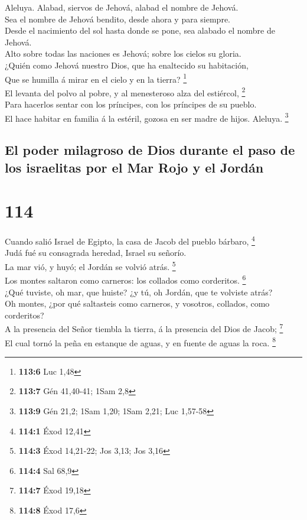  Aleluya. Alabad, siervos de Jehová, alabad el nombre de
Jehová.\\
 Sea el nombre de Jehová bendito, desde ahora y para
siempre.\\
 Desde el nacimiento del sol hasta donde se pone, sea
alabado el nombre de Jehová.\\
 Alto sobre todas las naciones es Jehová; sobre los cielos
su gloria.\\
 ¿Quién como Jehová nuestro Dios, que ha enaltecido su
habitación,\\
 Que se humilla á mirar en el cielo y en la tierra?
\footnote{\textbf{113:6} Luc 1,48}\\
 El levanta del polvo al pobre, y al menesteroso alza del
estiércol, \footnote{\textbf{113:7} Gén 41,40-41; 1Sam 2,8}\\
 Para hacerlos sentar con los príncipes, con los príncipes
de su pueblo.\\
 El hace habitar en familia á la estéril, gozosa en ser
madre de hijos. Aleluya. \footnote{\textbf{113:9} Gén 21,2; 1Sam 1,20;
  1Sam 2,21; Luc 1,57-58}

\hypertarget{el-poder-milagroso-de-dios-durante-el-paso-de-los-israelitas-por-el-mar-rojo-y-el-jorduxe1n}{%
\subsection{El poder milagroso de Dios durante el paso de los israelitas
por el Mar Rojo y el
Jordán}\label{el-poder-milagroso-de-dios-durante-el-paso-de-los-israelitas-por-el-mar-rojo-y-el-jorduxe1n}}

\hypertarget{section-113}{%
\section{114}\label{section-113}}

 Cuando salió Israel de Egipto, la casa de Jacob del
pueblo bárbaro, \footnote{\textbf{114:1} Éxod 12,41}\\
 Judá fué su consagrada heredad, Israel su señorío.\\
 La mar vió, y huyó; el Jordán se volvió atrás.
\footnote{\textbf{114:3} Éxod 14,21-22; Jos 3,13; Jos 3,16}\\
 Los montes saltaron como carneros: los collados como
corderitos. \footnote{\textbf{114:4} Sal 68,9}\\
 ¿Qué tuviste, oh mar, que huiste? ¿y tú, oh Jordán, que
te volviste atrás?\\
 Oh montes, ¿por qué saltasteis como carneros, y vosotros,
collados, como corderitos?\\
 A la presencia del Señor tiembla la tierra, á la
presencia del Dios de Jacob; \footnote{\textbf{114:7} Éxod 19,18}\\
 El cual tornó la peña en estanque de aguas, y en fuente
de aguas la roca. \footnote{\textbf{114:8} Éxod 17,6}

